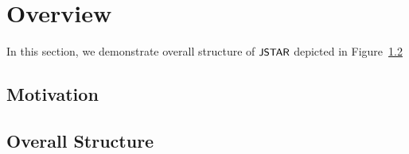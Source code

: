 \section{Overview}\label{sec:overview}


In this section, we demonstrate overall structure of $\textsf{\small JSTAR}$ depicted in
Figure~\ref{}

\subsection{Motivation}
\subsection{Overall Structure}
